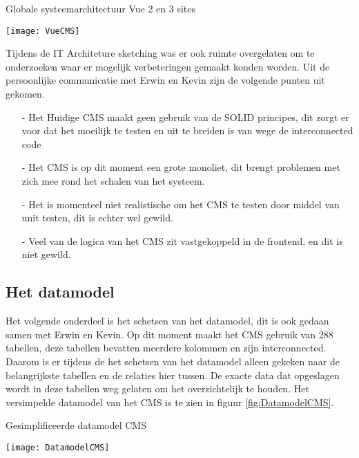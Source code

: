 \begin{graphic}
	\captionsetup{type=figure}
	\caption{Globale systeemarchitectuur Vue 2 en 3 sites}
    \texttt{[image: VueCMS]}
	\label{fig:SystemArchitectureVue}
\end{graphic}


\whitespace
Tijdens de IT Architeture sketching was er ook ruimte overgelaten om te onderzoeken waar er mogelijk verbeteringen gemaakt konden worden.
Uit de persoonlijke communicatie met Erwin en Kevin zijn de volgende punten uit gekomen.

\begin{itemize}
	\item[-]{Het Huidige \gls{CMS} maakt geen gebruik van de SOLID principes, dit zorgt er voor dat het moeilijk te testen en uit te breiden is van wege de interconnected code}
	\item[-]{Het \gls{CMS} is op dit moment een grote monoliet, dit brengt problemen met zich mee rond het schalen van het systeem.}
	\item[-]{Het is momenteel niet realistische om het \gls{CMS} te testen door middel van unit testen, dit is echter wel gewild.}
    \item[-]{Veel van de logica van het CMS zit vastgekoppeld in de frontend, en dit is niet gewild.}
\end{itemize}

\newpage
\subsection{Het datamodel}
Het volgende onderdeel is het schetsen van het datamodel, dit is ook gedaan samen met Erwin en Kevin.
Op dit moment maakt het \gls{CMS} gebruik van 288 tabellen, deze tabellen bevatten meerdere kolommen en zijn interconnected.
Daarom is er tijdens de het schetsen van het datamodel alleen gekeken naar de belangrijkste tabellen en de relaties hier tussen.
De exacte data dat opgeslagen wordt in deze tabellen weg gelaten om het overzichtelijk te houden.
Het versimpelde datamodel van het CMS is te zien in figuur \ref{fig:DatamodelCMS}.

\begin{graphic}
	\captionsetup{type=figure}
	\caption{Gesimplificeerde datamodel CMS}
	\texttt{[image: DatamodelCMS]}
	\label{fig:DatamodelCMS}
\end{graphic}


